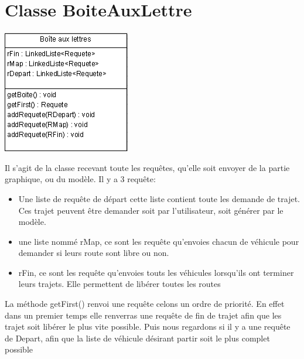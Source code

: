 \documentclass[a4paper, titlepage]{report}
\begin{document}
\section{Classe BoiteAuxLettre}
   \begin{minipage}{0.49\textwidth}
       \includegraphics[scale=1]{Images/BoiteAuxLettre.PNG}
    \end{minipage}
    \begin{minipage}{0.49\textwidth}
      Il s'agit de la classe recevant toute les requêtes, qu'elle soit envoyer de la partie graphique, ou du modèle. Il y a 3 requête:
      \begin{itemize}
      \item Une liste de requête de départ cette liste contient toute les demande de trajet. Ces trajet peuvent être demander soit par l'utilisateur, soit générer par le modèle.
      \item une liste nommé rMap, ce sont les requête qu'envoies chacun de véhicule pour demander si leurs route sont libre ou non.
      \item rFin, ce sont les requête qu'envoies touts les véhicules lorsqu'ils ont terminer leurs trajets. Elle permettent de libérer toutes les routes 
      \end{itemize}
      La méthode getFirst() renvoi une requête celons un ordre de priorité. En effet dans un premier temps elle renverras une requête de fin de trajet afin que les trajet soit libérer le plus vite possible. Puis nous regardons si il y a une requête de Depart, afin que la liste de véhicule désirant partir soit le plus complet possible
    \end{minipage}
    
\appendix
\end{document}
